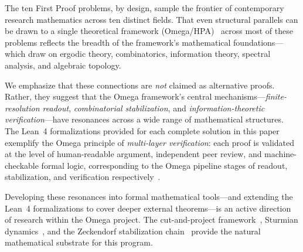 The ten First Proof problems, by design, sample the frontier of
contemporary research mathematics across ten distinct fields.
That even structural parallels can be drawn to a single theoretical
framework (Omega/HPA)~\cite{omega-theory} across most of these problems
reflects the breadth of the framework's mathematical foundations---which
draw on ergodic theory, combinatorics, information theory, spectral
analysis, and algebraic topology.

We emphasize that these connections are \emph{not} claimed as
alternative proofs.  Rather, they suggest that the Omega framework's
central mechanisms---\emph{finite-resolution readout},
\emph{combinatorial stabilization}, and \emph{information-theoretic
verification}---have resonances across a wide range of mathematical
structures.  The Lean~4 formalizations provided for each complete solution
in this paper exemplify the Omega principle of \emph{multi-layer
verification}: each proof is validated at the level of human-readable
argument, independent peer review, and machine-checkable formal logic,
corresponding to the Omega pipeline stages of readout, stabilization,
and verification respectively~\cite{omega-grg}.

Developing these resonances into formal mathematical tools---and
extending the Lean~4 formalizations to cover deeper external
theorems---is an active direction of research within the Omega project.
The cut-and-project framework~\cite{baake-grimm2013}, Sturmian
dynamics~\cite{morse-hedlund1940,lind-marcus1995}, and the Zeckendorf
stabilization chain~\cite{omega-zeckendorf} provide the natural
mathematical substrate for this program.
